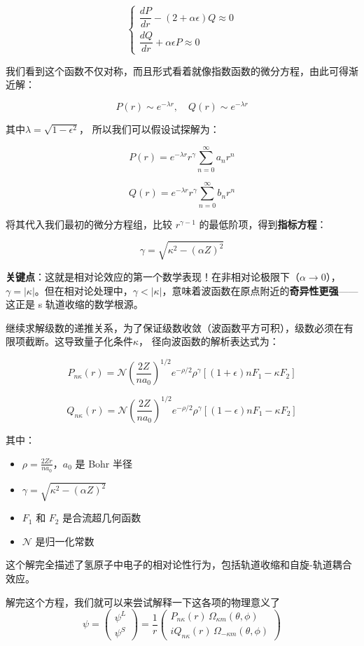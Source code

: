 \documentclass[UTF8]{ctexbook}
\begin{document}
\[
\begin{cases}
\dfrac{dP}{dr} - (2 + \alpha\epsilon) Q \approx 0 \\[1.2em]
\dfrac{dQ}{dr} + \alpha\epsilon P \approx 0
\end{cases}
\]

我们看到这个函数不仅对称，而且形式看着就像指数函数的微分方程，由此可得渐近解：

\[
P(r) \sim e^{-\lambda r}, \quad Q(r) \sim e^{-\lambda r}
\]

其中$\lambda = \sqrt{1 - \epsilon^2}$，
所以我们可以假设试探解为：

\[
P(r) = e^{-\lambda r} r^\gamma \sum_{n=0}^\infty a_n r^n
\]

\[
Q(r) = e^{-\lambda r} r^\gamma \sum_{n=0}^\infty b_n r^n
\]

将其代入我们最初的微分方程组，比较 \(r^{\gamma-1}\) 的最低阶项，得到\textbf{指标方程}：

\[
\gamma = \sqrt{\kappa^2 - (\alpha Z)^2}
\]

\textbf{关键点}：这就是相对论效应的第一个数学表现！在非相对论极限下（\(\alpha \to 0\)），\(\gamma = |\kappa|\)。但在相对论处理中，\(\gamma < |\kappa|\)，意味着波函数在原点附近的\textbf{奇异性更强}——这正是 s 轨道收缩的数学根源。

继续求解级数的递推关系，为了保证级数收敛（波函数平方可积），级数必须在有限项截断。这导致量子化条件$\kappa$，
径向波函数的解析表达式为：

\[
P_{n\kappa}(r) = \mathcal{N} \left( \frac{2Z}{na_0} \right)^{1/2} e^{-\rho/2} \rho^\gamma \left[ (1+\epsilon) n F_1 - \kappa F_2 \right]
\]

\[
Q_{n\kappa}(r) = \mathcal{N} \left( \frac{2Z}{na_0} \right)^{1/2} e^{-\rho/2} \rho^\gamma \left[ (1-\epsilon) n F_1 - \kappa F_2 \right]
\]

其中：
\begin{itemize}
    \item \(\rho = \frac{2Z r}{na_0}\)，\(a_0\) 是 Bohr 半径
    \item \(\gamma = \sqrt{\kappa^2 - (\alpha Z)^2}\)
    \item \(F_1\) 和 \(F_2\) 是合流超几何函数
    \item \(\mathcal{N}\) 是归一化常数
\end{itemize}

这个解完全描述了氢原子中电子的相对论性行为，包括轨道收缩和自旋-轨道耦合效应。

解完这个方程，我们就可以来尝试解释一下这各项的物理意义了
\[
\psi = \begin{pmatrix} \psi^L \\ \psi^S \end{pmatrix} = \frac{1}{r} \begin{pmatrix} P_{n\kappa}(r) \, \Omega_{\kappa m}(\theta, \phi) \\ i Q_{n\kappa}(r) \, \Omega_{-\kappa m}(\theta, \phi) \end{pmatrix}
\]
\end{document}

